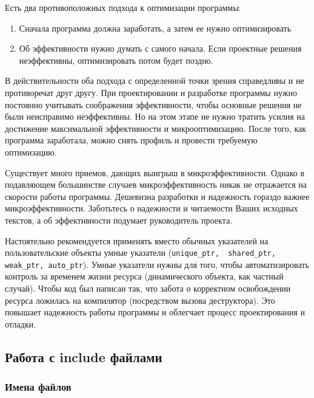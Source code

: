 Есть два противоположных подхода к оптимизации программы:

\begin{enumerate}
\item Сначала программа должна заработать, а затем ее нужно оптимизировать
\item Об эффективности нужно думать с самого начала. Если проектные решения неэффективны, оптимизировать потом будет поздно.
\end{enumerate}

В действительности оба подхода с определенной точки зрения справедливы и не противоречат друг другу. При проектировании и разработке программы нужно постоянно учитывать соображения эффективности, чтобы основные решения не были неисправимо неэффективны. Но на этом этапе не нужно тратить усилия на достижение максимальной эффективности и микрооптимизацию. После того, как программа заработала, можно снять профиль и провести требуемую оптимизацию.

Существует много приемов, дающих выигрыш в микроэффективности. Однако в подавляющем большинстве случаев микроэффективность никак не отражается на скорости работы программы. Дешевизна разработки и надежность гораздо важнее микроэффективности. Заботьтесь о надежности и читаемости Ваших исходных текстов, а об эффективности подумает руководитель проекта.

Настоятельно рекомендуется применять вместо обычных указателей на пользовательские объекты умные указатели (\lstinline|unique_ptr,  shared_ptr, weak_ptr, auto_ptr|). Умные указатели нужны для того, чтобы автоматизировать контроль за временем жизни ресурса (динамического объекта, как частный случай). Чтобы код был написан так, что забота о корректном освобождении ресурса ложилась на компилятор (посредством вызова деструктора). Это повышает надежность работы программы и облегчает процесс проектирования и отладки.

\subsection{Работа с include файлами}

\subsubsection{Имена файлов}

